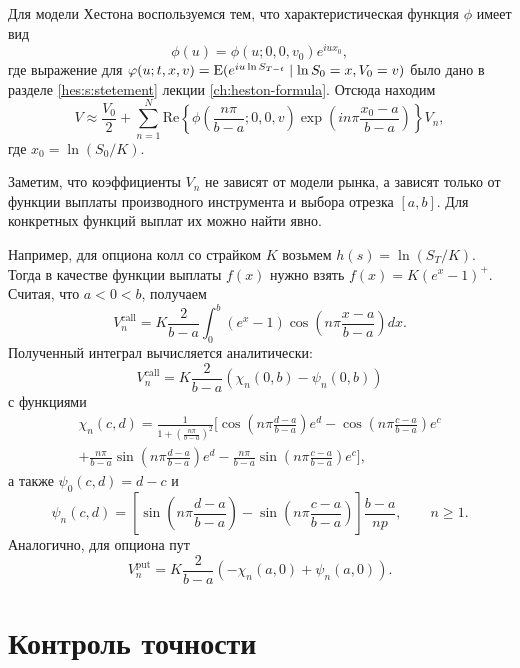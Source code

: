 Для модели Хестона воспользуемся тем, что характеристическая функция $\phi$ имеет вид
\[
\phi(u) = \phi(u; 0,0,v_0) e^{iux_0},
\]
где выражение для $\varphi(u;t,x,v) = \operatorname{E}(e^{iu\ln S_{T-t}} \mid \ln S_0=x, V_0=v)$ было дано в разделе \ref{hes:s:stetement} лекции \ref{ch:heston-formula}.
Отсюда находим
\[
V \approx 
  \frac{V_0}{2} 
    + \sum_{n=1}^N \mathrm{Re}\left\{
      \phi\left(\frac{n\pi}{b-a};0,0,v\right) \exp\left(in\pi \frac{x_0-a}{b-a}\right) 
    \right\} V_n,
\]
где $x_0 = \ln(S_0/K)$.

Заметим, что коэффициенты $V_n$ не зависят от модели рынка, а зависят только от функции выплаты производного инструмента и выбора отрезка $[a,b]$.
Для конкретных функций выплат их можно найти явно.

Например, для опциона колл со страйком $K$ возьмем $h(s) = \ln(S_T/K)$.
Тогда в качестве функции выплаты $f(x)$ нужно взять $f(x) = K(e^x-1)^+$.
Считая, что $a<0<b$, получаем
\[
V_n^\text{call} = K\frac{2}{b-a}\int_0^b (e^x-1) \cos\left(n\pi\frac{x-a}{b-a}\right) dx.
\]
Полученный интеграл вычисляется аналитически:
\[
V_n^\text{call} = K\frac{2}{b-a}(\chi_n(0,b) - \psi_n(0,b))
\]
с функциями
\begin{multline*}
\chi_n(c,d) = \frac{1}{1+\left(\frac{n\pi}{b-a}\right)^2}\biggl[\cos\left(n\pi \frac{d-a}{b-a}\right)e^d - \cos\left(n\pi\frac{c-a}{b-a}\right)e^c \\
+\frac{n\pi}{b-a}\sin\left(n\pi\frac{d-a}{b-a}\right)e^d - \frac{n\pi}{b-a}\sin\left(n\pi\frac{c-a}{b-a}\right)e^c\biggr],
\end{multline*}
а также $\psi_0(c,d) = d-c$ и
\[
\psi_n(c,d) = \left[\sin\left(n\pi\frac{d-a}{b-a}\right) - \sin\left(n\pi\frac{c-a}{b-a}\right)\right]\frac{b-a}{np}, \qquad n\ge 1.
\]
Аналогично, для опциона пут
\[
V_n^\text{put} = K\frac{2}{b-a}(-\chi_n(a,0) + \psi_n(a,0)).
\]


\section{Контроль точности}

